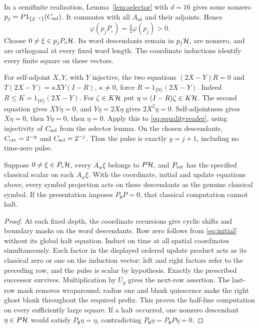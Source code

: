 In a semifinite realization, Lemma~\ref{lem:selector} with $d=16$ gives
some nonzero $p_j=P1_{\{2^{-j}\}}(C_{\rm sel})$. It commutes with all
$A_{ab}$ and their adjoints. Hence
\begin{equation}\label{eq:terminalroot}
 \varphi(p_jP_\circ)=\tfrac34\varphi(p_j)>0.
\end{equation}
Choose $0\ne\xi\in p_jP_\circ\mathcal H$. Its word descendants remain in
$p_j\mathcal H$, are nonzero, and are orthogonal at every fixed word length.
The coordinate inductions identify every finite square on these vectors.

For self-adjoint $X,Y$, with $Y$ injective, the two equations
$(2X-Y)R=0$ and $T(2X-Y)=\kappa XY(I-R)$, $\kappa\ne0$, force
$R=1_{\{0\}}(2X-Y)$. Indeed $R\le K=1_{\{0\}}(2X-Y)$.
For $\zeta\in K\mathcal H$ put $\eta=(I-R)\zeta\in K\mathcal H$. The second equation
gives $XY\eta=0$, and $Y\eta=2X\eta$ gives $2X^2\eta=0$.
Self-adjointness gives $X\eta=0$, then $Y\eta=0$, then $\eta=0$.
Apply this to \eqref{eq:equalityreader}, using injectivity of
$C_{\rm sel}$ from the selector lemma. On the chosen descendants,
$C_{\rm ctr}=2^{-y}$ and $C_{\rm sel}=2^{-j}$. Thus the pulse is
exactly $y=j+1$, including no time-zero pulse.

\begin{lemma}\label{lem:terminaltableau}
Suppose $0\ne\xi\in P_\circ\mathcal H$, every $A_w\xi$ belongs to $P\mathcal H$,
and $P_{\rm ret}$ has the specified classical scalar on each $A_w\xi$.
With the coordinate, initial and update equations above, every symbol
projection acts on these descendants as the genuine classical symbol.
If the presentation imposes $P_{\mathtt H}P=0$, that classical
computation cannot halt.
\end{lemma}
\begin{proof}
At each fixed depth, the coordinate recursions give cyclic shifts and
boundary masks on the word descendants. Row zero follows from
\eqref{eq:initial} without its global halt equation. Induct on time at
all spatial coordinates simultaneously. Each factor in the displayed
ordered update product acts as its classical zero or one on the
induction vector: left and right factors refer to the preceding row,
and the pulse is scalar by hypothesis. Exactly the prescribed successor
survives. Multiplication by $U_y$ gives the next-row assertion. The
last-row mask removes wraparound; radius one and blank quiescence make
the right ghost blank throughout the required prefix. This proves the
half-line computation on every sufficiently large square. If a halt
occurred, one nonzero descendant $\eta\in P\mathcal H$ would satisfy
$P_{\mathtt H}\eta=\eta$, contradicting
$P_{\mathtt H}\eta=P_{\mathtt H}P\eta=0$.
\end{proof}

